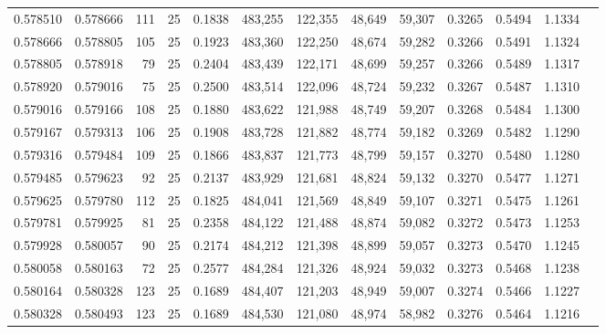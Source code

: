\begin{tabular}{rrrrrrrrrrrrr}
0.578510 & 0.578666 &   111 &  25 &                                     0.1838 & 483,255 & 122,355 &  48,649 &  59,307 & 0.3265 & 0.5494 & 1.1334 \\
0.578666 & 0.578805 &   105 &  25 &                                     0.1923 & 483,360 & 122,250 &  48,674 &  59,282 & 0.3266 & 0.5491 & 1.1324 \\
0.578805 & 0.578918 &    79 &  25 &                                     0.2404 & 483,439 & 122,171 &  48,699 &  59,257 & 0.3266 & 0.5489 & 1.1317 \\
0.578920 & 0.579016 &    75 &  25 &                                     0.2500 & 483,514 & 122,096 &  48,724 &  59,232 & 0.3267 & 0.5487 & 1.1310 \\
0.579016 & 0.579166 &   108 &  25 &                                     0.1880 & 483,622 & 121,988 &  48,749 &  59,207 & 0.3268 & 0.5484 & 1.1300 \\
0.579167 & 0.579313 &   106 &  25 &                                     0.1908 & 483,728 & 121,882 &  48,774 &  59,182 & 0.3269 & 0.5482 & 1.1290 \\
0.579316 & 0.579484 &   109 &  25 &                                     0.1866 & 483,837 & 121,773 &  48,799 &  59,157 & 0.3270 & 0.5480 & 1.1280 \\
0.579485 & 0.579623 &    92 &  25 &                                     0.2137 & 483,929 & 121,681 &  48,824 &  59,132 & 0.3270 & 0.5477 & 1.1271 \\
0.579625 & 0.579780 &   112 &  25 &                                     0.1825 & 484,041 & 121,569 &  48,849 &  59,107 & 0.3271 & 0.5475 & 1.1261 \\
0.579781 & 0.579925 &    81 &  25 &                                     0.2358 & 484,122 & 121,488 &  48,874 &  59,082 & 0.3272 & 0.5473 & 1.1253 \\
0.579928 & 0.580057 &    90 &  25 &                                     0.2174 & 484,212 & 121,398 &  48,899 &  59,057 & 0.3273 & 0.5470 & 1.1245 \\
0.580058 & 0.580163 &    72 &  25 &                                     0.2577 & 484,284 & 121,326 &  48,924 &  59,032 & 0.3273 & 0.5468 & 1.1238 \\
0.580164 & 0.580328 &   123 &  25 &                                     0.1689 & 484,407 & 121,203 &  48,949 &  59,007 & 0.3274 & 0.5466 & 1.1227 \\
0.580328 & 0.580493 &   123 &  25 &                                     0.1689 & 484,530 & 121,080 &  48,974 &  58,982 & 0.3276 & 0.5464 & 1.1216 \\

\end{tabular}

